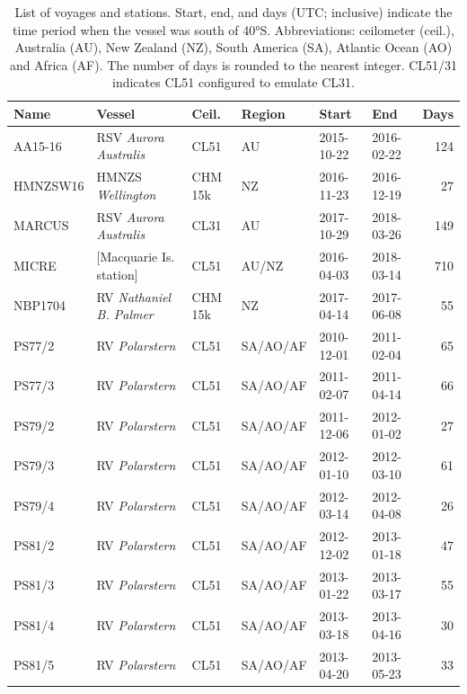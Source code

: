 \documentclass[12pt,a4paper]{article}
\begin{document}
\begin{table}
\caption{
List of voyages and stations. Start, end, and days (UTC; inclusive)
indicate the time period when the vessel was south of 40°S. Abbreviations:
ceilometer (ceil.), Australia (AU), New Zealand (NZ), South America (SA),
Atlantic Ocean (AO) and Africa (AF). The number of days is rounded to the
nearest integer. CL51/31 indicates CL51 configured to emulate CL31.
}
\label{tab:voyages}
\small
\begin{tabular}{llllllr}
\textbf{Name} & \textbf{Vessel} & \textbf{Ceil.} & \textbf{Region} & \textbf{Start} & \textbf{End} & \textbf{Days}\\
\hline
AA15-16  & RSV \emph{Aurora Australis}   & CL51    & AU       & 2015-10-22 & 2016-02-22 & 124 \\
HMNZSW16 & HMNZS \emph{Wellington}       & CHM 15k & NZ       & 2016-11-23 & 2016-12-19 & 27 \\
MARCUS   & RSV \emph{Aurora Australis}   & CL31    & AU       & 2017-10-29 & 2018-03-26 & 149 \\
MICRE    & [Macquarie Is. station]       & CL51    & AU/NZ    & 2016-04-03 & 2018-03-14 & 710 \\
NBP1704  & RV \emph{Nathaniel B. Palmer} & CHM 15k & NZ       & 2017-04-14 & 2017-06-08 & 55 \\
PS77/2   & RV \emph{Polarstern}          & CL51    & SA/AO/AF & 2010-12-01 & 2011-02-04 & 65 \\
PS77/3   & RV \emph{Polarstern}          & CL51    & SA/AO/AF & 2011-02-07 & 2011-04-14 & 66 \\
PS79/2   & RV \emph{Polarstern}          & CL51    & SA/AO/AF & 2011-12-06 & 2012-01-02 & 27 \\
PS79/3   & RV \emph{Polarstern}          & CL51    & SA/AO/AF & 2012-01-10 & 2012-03-10 & 61 \\
PS79/4   & RV \emph{Polarstern}          & CL51    & SA/AO/AF & 2012-03-14 & 2012-04-08 & 26 \\
PS81/2   & RV \emph{Polarstern}          & CL51    & SA/AO/AF & 2012-12-02 & 2013-01-18 & 47 \\
PS81/3   & RV \emph{Polarstern}          & CL51    & SA/AO/AF & 2013-01-22 & 2013-03-17 & 55 \\
PS81/4   & RV \emph{Polarstern}          & CL51    & SA/AO/AF & 2013-03-18 & 2013-04-16 & 30 \\
PS81/5   & RV \emph{Polarstern}          & CL51    & SA/AO/AF & 2013-04-20 & 2013-05-23 & 33 \\

\end{tabular}
\end{table}
\end{document}
